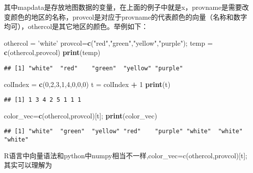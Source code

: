 \documentclass[]{article}
\newenvironment{Shaded}{\begin{snugshade}}{\end{snugshade}}
\newcommand{\KeywordTok}[1]{\textcolor[rgb]{0.13,0.29,0.53}{\textbf{#1}}}
\newcommand{\DecValTok}[1]{\textcolor[rgb]{0.00,0.00,0.81}{#1}}
\newcommand{\StringTok}[1]{\textcolor[rgb]{0.31,0.60,0.02}{#1}}
\newcommand{\OperatorTok}[1]{\textcolor[rgb]{0.81,0.36,0.00}{\textbf{#1}}}
\newcommand{\NormalTok}[1]{#1}
\begin{document}
其中mapdata是存放地图数据的变量，在上面的例子中就是x，provname是需要改变颜色的地区的名称，provcol是对应于provname的代表颜色的向量（名称和数字均可），othercol是其它地区的颜色。举例如下：

\begin{Shaded}
\begin{Highlighting}[]
\NormalTok{othercol =}\StringTok{ 'white'}
\NormalTok{provcol=}\KeywordTok{c}\NormalTok{(}\StringTok{"red"}\NormalTok{,}\StringTok{"green"}\NormalTok{,}\StringTok{"yellow"}\NormalTok{,}\StringTok{"purple"}\NormalTok{);}
\NormalTok{temp =}\StringTok{ }\KeywordTok{c}\NormalTok{(othercol,provcol)}
\KeywordTok{print}\NormalTok{(temp)}
\end{Highlighting}
\end{Shaded}

\begin{verbatim}
## [1] "white"  "red"    "green"  "yellow" "purple"
\end{verbatim}

\begin{Shaded}
\begin{Highlighting}[]
\NormalTok{colIndex =}\StringTok{ }\KeywordTok{c}\NormalTok{(}\DecValTok{0}\NormalTok{,}\DecValTok{2}\NormalTok{,}\DecValTok{3}\NormalTok{,}\DecValTok{1}\NormalTok{,}\DecValTok{4}\NormalTok{,}\DecValTok{0}\NormalTok{,}\DecValTok{0}\NormalTok{,}\DecValTok{0}\NormalTok{)}
\NormalTok{t =}\StringTok{ }\NormalTok{colIndex }\OperatorTok{+}\StringTok{ }\DecValTok{1}
\KeywordTok{print}\NormalTok{(t)}
\end{Highlighting}
\end{Shaded}

\begin{verbatim}
## [1] 1 3 4 2 5 1 1 1
\end{verbatim}

\begin{Shaded}
\begin{Highlighting}[]
\NormalTok{color_vec=}\KeywordTok{c}\NormalTok{(othercol,provcol)[t];}
\KeywordTok{print}\NormalTok{(color_vec)}
\end{Highlighting}
\end{Shaded}

\begin{verbatim}
## [1] "white"  "green"  "yellow" "red"    "purple" "white"  "white"  "white"
\end{verbatim}

R语言中向量语法和python中numpy相当不一样,color\_vec=c(othercol,provcol){[}t{]};
其实可以理解为
\end{document}

